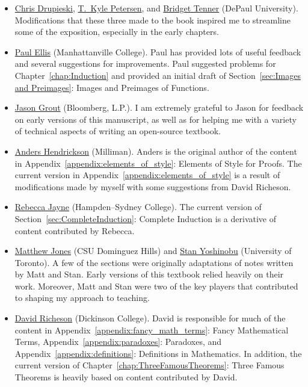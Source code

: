 \begin{itemize}
\item \href{https://math.depaul.edu/cdrupies/}{Chris Drupieski}, \href{http://math.depaul.edu/tpeter21/}{T.~Kyle Petersen}, and \href{http://math.depaul.edu/bridget/}{Bridget Tenner} (DePaul University). Modifications that these three made to the book inspired me to streamline some of the exposition, especially in the early chapters.
\item \href{http://www.paulellis.org}{Paul Ellis} (Manhattanville College). Paul has provided lots of useful feedback and several suggestions for improvements. Paul suggested problems for Chapter~\ref{chap:Induction} and provided an initial draft of Section~\ref{sec:Images and Preimages}: Images and Preimages of Functions.
\item \href{http://jasongrout.org}{Jason Grout} (Bloomberg, L.P.).  I am extremely grateful to Jason for feedback on early versions of this manuscript, as well as for helping me with a variety of technical aspects of writing an open-source textbook.
\item \href{https://www.linkedin.com/in/andershendrickson/}{Anders Hendrickson} (Milliman). Anders is the original author of the content in Appendix~\ref{appendix:elements_of_style}: Elements of Style for Proofs. The current version in Appendix~\ref{appendix:elements_of_style} is a result of modifications made by myself with some suggestions from David Richeson.
\item \href{http://www.hsc.edu/rebecca-jayne}{Rebecca Jayne} (Hampden--Sydney College). The current version of Section~\ref{sec:CompleteInduction}: Complete Induction is a derivative of content contributed by Rebecca.
\item \href{http://www4.csudh.edu/library/info/civic-directory/f-j/matthew-g-jones}{Matthew Jones} (CSU Dominguez Hills) and \href{http://www.stanyoshinobu.com}{Stan Yoshinobu} (University of Toronto). A few of the sections were originally adaptations of notes written by Matt and Stan. Early versions of this textbook relied heavily on their work. Moreover, Matt and Stan were two of the key players that contributed to shaping my approach to teaching.
\item \href{http://users.dickinson.edu/~richesod/}{David Richeson} (Dickinson College). David is responsible for much of the content in Appendix~\ref{appendix:fancy_math_terms}: Fancy Mathematical Terms, Appendix~\ref{appendix:paradoxes}: Paradoxes, and Appendix~\ref{appendix:definitions}: Definitions in Mathematics. In addition, the current version of Chapter~\ref{chap:ThreeFamousTheorems}: Three Famous Theorems is heavily based on content contributed by David.

\end{itemize}

